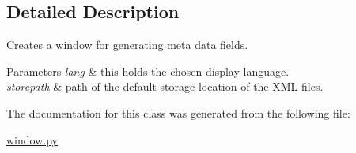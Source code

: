 \subsection{Detailed Description}
Creates a window for generating meta data fields. 


\begin{DoxyParams}{Parameters}
{\em lang} & this holds the chosen display language. \\
\hline
{\em storepath} & path of the default storage location of the X\+ML files. \\
\hline
\end{DoxyParams}


The documentation for this class was generated from the following file\+:\begin{DoxyCompactItemize}
\item 
\hyperlink{window_8py}{window.\+py}\end{DoxyCompactItemize}
